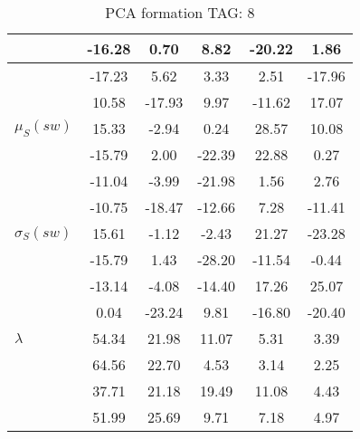 \begin{table}[h!]
\begin{center}
\begin{tabular}{| l | c | c | c | c | c |}
 & -16.28  & 0.70  & 8.82  & -20.22  & 1.86 \\\hline
 & -17.23  & 5.62  & 3.33  & 2.51  & -17.96 \\\hline
 & 10.58  & -17.93  & 9.97  & -11.62  & 17.07 \\\hline
$\mu_S(sw)$ & 15.33  & -2.94  & 0.24  & 28.57  & 10.08 \\\hline
 & -15.79  & 2.00  & -22.39  & 22.88  & 0.27 \\\hline
 & -11.04  & -3.99  & -21.98  & 1.56  & 2.76 \\\hline
 & -10.75  & -18.47  & -12.66  & 7.28  & -11.41 \\\hline
$\sigma_S(sw)$ & 15.61  & -1.12  & -2.43  & 21.27  & -23.28 \\\hline
 & -15.79  & 1.43  & -28.20  & -11.54  & -0.44 \\\hline
 & -13.14  & -4.08  & -14.40  & 17.26  & 25.07 \\\hline
 & 0.04  & -23.24  & 9.81  & -16.80  & -20.40 \\\hline
$\lambda$ & 54.34  & 21.98  & 11.07  & 5.31  & 3.39 \\\hline
 & 64.56  & 22.70  & 4.53  & 3.14  & 2.25 \\\hline
 & 37.71  & 21.18  & 19.49  & 11.08  & 4.43 \\\hline
 & 51.99  & 25.69  & 9.71  & 7.18  & 4.97 \\\hline
\end{tabular}
\caption{PCA formation TAG: 8}
\end{center}
\end{table}